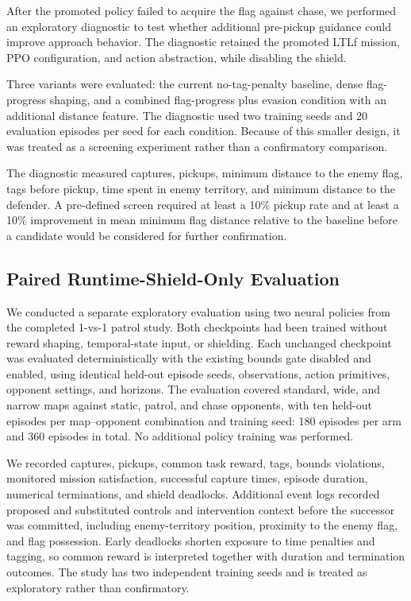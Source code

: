 \documentclass[letterpaper]{article}
\begin{document}
After the promoted policy failed to acquire the flag against chase, we performed an exploratory diagnostic to test whether additional pre-pickup guidance could improve approach behavior. The diagnostic retained the promoted LTLf mission, PPO configuration, and action abstraction, while disabling the shield.

Three variants were evaluated: the current no-tag-penalty baseline, dense flag-progress shaping, and a combined flag-progress plus evasion condition with an additional distance feature. The diagnostic used two training seeds and 20 evaluation episodes per seed for each condition. Because of this smaller design, it was treated as a screening experiment rather than a confirmatory comparison.

The diagnostic measured captures, pickups, minimum distance to the enemy flag, tags before pickup, time spent in enemy territory, and minimum distance to the defender. A pre-defined screen required at least a 10\% pickup rate and at least a 10\% improvement in mean minimum flag distance relative to the baseline before a candidate would be considered for further confirmation.

\subsection{Paired Runtime-Shield-Only Evaluation}

We conducted a separate exploratory evaluation using two neural policies from the completed 1-vs-1 patrol study. Both checkpoints had been trained without reward shaping, temporal-state input, or shielding. Each unchanged checkpoint was evaluated deterministically with the existing bounds gate disabled and enabled, using identical held-out episode seeds, observations, action primitives, opponent settings, and horizons. The evaluation covered standard, wide, and narrow maps against static, patrol, and chase opponents, with ten held-out episodes per map--opponent combination and training seed: 180 episodes per arm and 360 episodes in total. No additional policy training was performed.

We recorded captures, pickups, common task reward, tags, bounds violations, monitored mission satisfaction, successful capture times, episode duration, numerical terminations, and shield deadlocks. Additional event logs recorded proposed and substituted controls and intervention context before the successor was committed, including enemy-territory position, proximity to the enemy flag, and flag possession. Early deadlocks shorten exposure to time penalties and tagging, so common reward is interpreted together with duration and termination outcomes. The study has two independent training seeds and is treated as exploratory rather than confirmatory.
\end{document}
